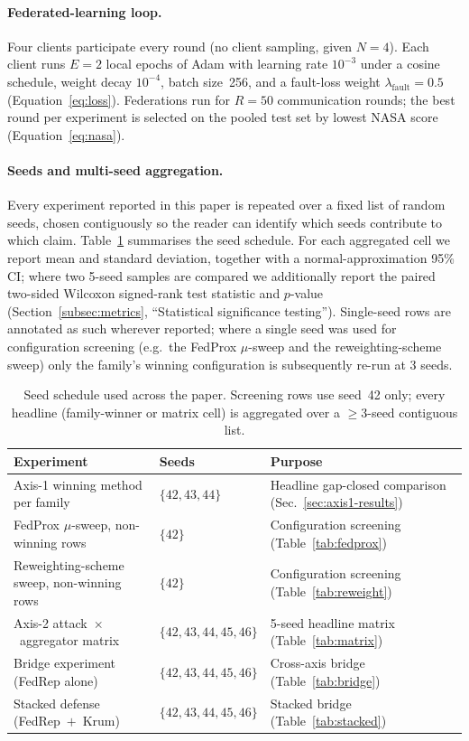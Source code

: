 \documentclass[preprint,12pt,authoryear]{elsarticle}
\begin{document}
\paragraph{Federated-learning loop.}
Four clients participate every round (no client sampling, given
$N = 4$). Each client runs $E = 2$ local epochs of Adam with
learning rate $10^{-3}$ under a cosine schedule, weight decay
$10^{-4}$, batch size~256, and a fault-loss weight
$\lambda_{\mathrm{fault}} = 0.5$
(Equation~\ref{eq:loss}). Federations run for
$R = 50$ communication rounds; the best round per experiment is
selected on the pooled test set by lowest NASA score
(Equation~\ref{eq:nasa}).

\paragraph{Seeds and multi-seed aggregation.}
Every experiment reported in this paper is repeated over a fixed
list of random seeds, chosen contiguously so the reader can identify
which seeds contribute to which claim. Table~\ref{tab:seed-usage}
summarises the seed schedule. For each aggregated cell we report
mean and standard deviation, together with a normal-approximation
95\%\,CI; where two 5-seed samples are compared we additionally
report the paired two-sided Wilcoxon signed-rank test statistic and
$p$-value (Section~\ref{subsec:metrics}, ``Statistical significance
testing''). Single-seed rows are annotated as such wherever
reported; where a single seed was used for configuration screening
(e.g.\ the FedProx $\mu$-sweep and the reweighting-scheme sweep)
only the family's winning configuration is subsequently re-run at
3 seeds.

\begin{table}[!ht]
\centering
\footnotesize
\setlength{\tabcolsep}{6pt}
\renewcommand{\arraystretch}{1.15}
\caption{Seed schedule used across the paper. Screening rows use
seed~42 only; every headline (family-winner or matrix cell) is
aggregated over a $\geq 3$-seed contiguous list.}
\label{tab:seed-usage}
\begin{tabular}{@{}l l l@{}}
\toprule
Experiment & Seeds & Purpose \\
\midrule
Axis-1 winning method per family        & $\{42, 43, 44\}$      & Headline gap-closed comparison (Sec.~\ref{sec:axis1-results}) \\
FedProx $\mu$-sweep, non-winning rows   & $\{42\}$              & Configuration screening (Table~\ref{tab:fedprox}) \\
Reweighting-scheme sweep, non-winning rows & $\{42\}$           & Configuration screening (Table~\ref{tab:reweight}) \\
Axis-2 attack~$\times$~aggregator matrix   & $\{42, 43, 44, 45, 46\}$ & 5-seed headline matrix (Table~\ref{tab:matrix}) \\
Bridge experiment (FedRep alone)        & $\{42, 43, 44, 45, 46\}$ & Cross-axis bridge (Table~\ref{tab:bridge}) \\
Stacked defense (FedRep~$+$~Krum)       & $\{42, 43, 44, 45, 46\}$ & Stacked bridge (Table~\ref{tab:stacked}) \\
\bottomrule
\end{tabular}
\end{table}
\end{document}
